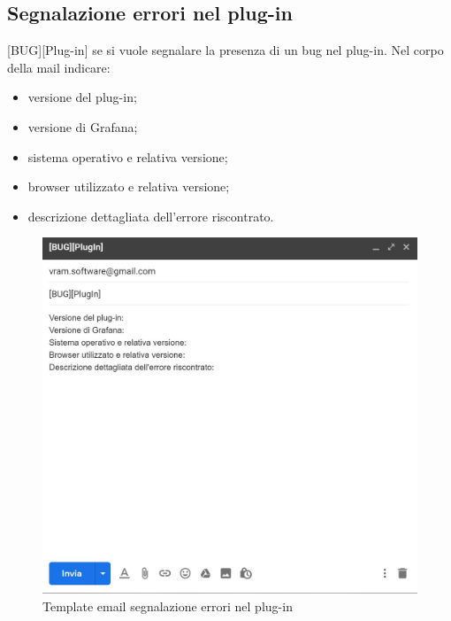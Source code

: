 	\subsection{Segnalazione errori nel plug-in}
 	[BUG][Plug-in] se si vuole segnalare la presenza di un bug nel plug-in.
 	Nel corpo della mail indicare:
 	\begin{itemize}
 		\item versione del plug-in;
 		\item versione di Grafana\glo;
 		\item sistema operativo e relativa versione;
 		\item browser utilizzato e relativa versione;
 		\item descrizione dettagliata dell'errore riscontrato.
 	\end{itemize}
 	\mbox{}
 	\begin{figure} [H]
 		\begin{center}
 			\includegraphics[width=120mm]{./img/erroriPlugIn.jpg}
 		\end{center}
 		\caption{Template email segnalazione errori nel plug-in}
 	\end{figure}
